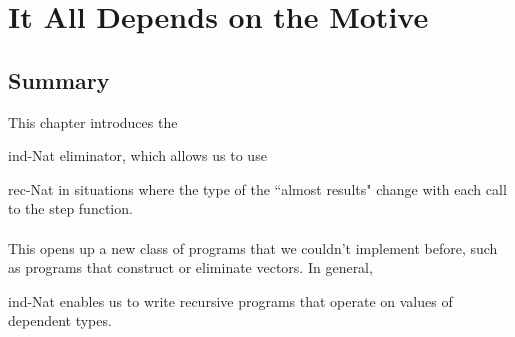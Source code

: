 \documentclass{article}
\newcommand*{\SavedLstInline}{}
\DeclareRobustCommand*{\lstinline}{%
  \ifmmode
    \let\SavedBGroup\bgroup
    \def\bgroup{%
      \let\bgroup\SavedBGroup
      \hbox\bgroup
    }%
  \fi
  \SavedLstInline
}
\begin{document}
\section{It All Depends on the Motive}
\subsection{Summary}
This chapter introduces the \lstinline{ind-Nat} eliminator, which allows us to use \lstinline{rec-Nat} in situations where the type of the ``almost results" change with each call to the step function. 
\\ \\
This opens up a new class of programs that we couldn't implement before, such as programs that construct or eliminate vectors. In general, \lstinline{ind-Nat} enables us to write recursive programs that operate on values of dependent types.
\end{document}
